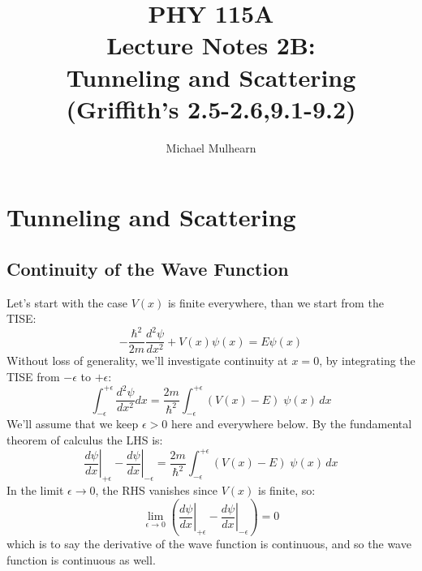 \documentclass[12pt]{book}
\begin{document}
\newcommand{\ihbar}{\ensuremath{i \hbar}}
\newcommand{\Pss}{\ensuremath{\Psi^*}}
\newcommand{\dPsidt}{\ensuremath{ \frac{\partial \Psi}{\partial t} }}
\newcommand{\dPsidx}{\ensuremath{ \frac{\partial \Psi}{\partial x} }}
\newcommand{\ddPsidx}{\ensuremath{ \frac{\partial^2 \Psi}{\partial x^2} }}
\newcommand{\dPssdt}{\ensuremath{ \frac{\partial \Psi^*}{\partial t} }}
\newcommand{\dPssdx}{\ensuremath{ \frac{\partial \Psi^*}{\partial x} }}
\newcommand{\ddPssdx}{\ensuremath{ \frac{\partial^2 \Psi^*}{\partial x^2} }}

\newcommand{\dphidt}{\ensuremath{ \frac{d \phi}{dt} }}
\newcommand{\dpsidx}{\ensuremath{ \frac{d \psi}{dx} }}
\newcommand{\ddpsidx}{\ensuremath{ \frac{d^2 \psi}{dx^2} }}


\title{PHY 115A \\ Lecture Notes 2B: \\ 
Tunneling and Scattering \\
(Griffith's 2.5-2.6,9.1-9.2)}
\author{Michael Mulhearn}

\maketitle

\setcounter{chapter}{1}
\chapter{Tunneling and Scattering}
\setcounter{section}{25}
\setcounter{equation}{70}

\section{Continuity of the Wave Function}

Let's start with the case $V(x)$ is finite everywhere, than we start from the TISE:
$$-\frac{\hbar^2}{2m}\frac{d^2 \psi}{d x^2} + V(x) \psi(x) = E \psi(x)$$
Without loss of generality, we'll investigate continuity at $x=0$, by integrating the TISE from $-\epsilon$ to $+\epsilon$:
$$\int_{-\epsilon}^{+\epsilon}\frac{d^2 \psi}{d x^2} dx = \frac{2m}{\hbar^2}\int_{-\epsilon}^{+\epsilon} \left(V(x) - E\right) \; \psi(x) \, dx$$
We'll assume that we keep $\epsilon > 0$ here and everywhere below.  By the fundamental theorem of calculus the LHS is:
\begin{equation}
\label{eqn:psicont}
\left. \frac{d\psi}{d x} \right\rvert_{+\epsilon} 
- \left. \frac{d\psi}{d x} \right\rvert_{-\epsilon}
 = \frac{2m}{\hbar^2}\int_{-\epsilon}^{+\epsilon} \left(V(x) - E\right) \; \psi(x) \, dx
\end{equation}
In the limit $\epsilon \to 0$, the RHS vanishes since $V(x)$ is finite, so:
$$ \lim_{\epsilon \to 0} \left( \left. \frac{d\psi}{d x} \right\rvert_{+\epsilon} 
- \left. \frac{d\psi}{d x} \right\rvert_{-\epsilon} \right) = 0$$
which is to say the derivative of the wave function is continuous, and so the wave function is continuous as well.
\end{document}
